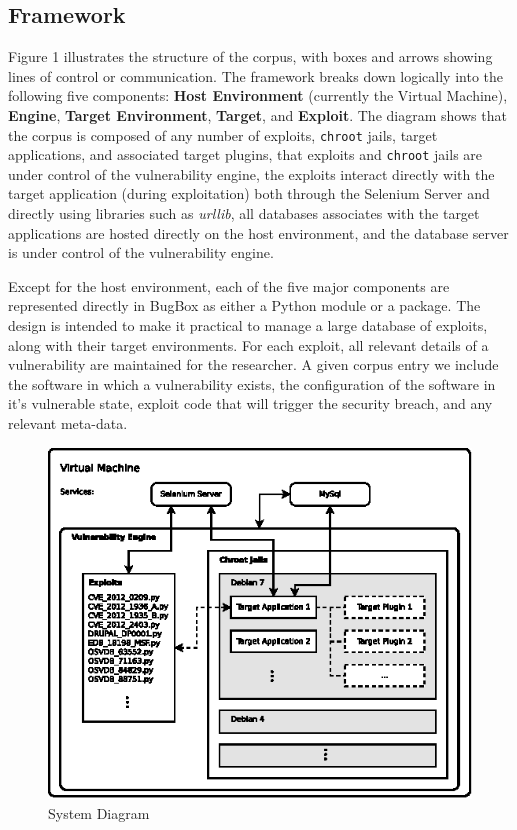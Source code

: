 \documentclass[letterpaper,twocolumn,10pt]{article}
\begin{document}
\subsection{Framework}

Figure 1 illustrates the structure of the corpus, with boxes and arrows showing lines of control or communication. The framework breaks down logically into the following five components: {\bf Host Environment} (currently the Virtual Machine), {\bf Engine}, {\bf Target Environment}, {\bf Target}, and {\bf Exploit}. The diagram shows that the corpus is composed of any number of exploits, {\tt chroot} jails, target applications, and associated target plugins, that exploits and {\tt chroot} jails are under control of the vulnerability engine, the exploits interact directly with the target application (during exploitation) both through the Selenium Server and directly using libraries such as \emph{urllib}, all databases associates with the target applications are hosted directly on the host environment, and the database server is under control of the vulnerability engine.\par
Except for the host environment, each of the five major components are represented directly in BugBox as either a Python module or a package. The design is intended to make it practical to manage a large database of exploits, along with their target environments. For each exploit, all relevant details of a vulnerability are maintained for the researcher. A given corpus entry we include the software in which a vulnerability exists, the configuration of the software in it's vulnerable state, exploit code that will trigger the security breach, and any relevant meta-data.\par

\begin{figure}[!tp]
\begin{center}
\includegraphics[scale=1.17]{system_diagram.eps}
\end{center}
\caption{System Diagram}
\end{figure}
\end{document}
